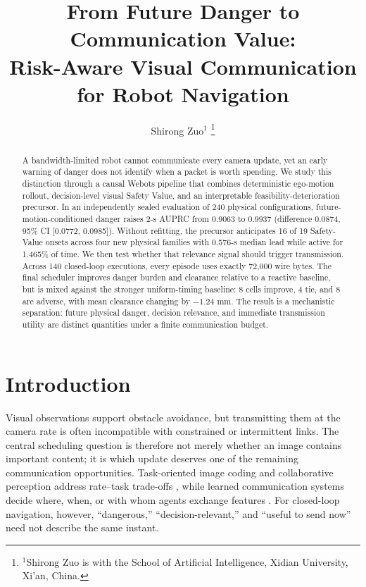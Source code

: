 \documentclass[letterpaper,10pt,conference]{ieeeconf}
\title{\LARGE \bf
From Future Danger to Communication Value:\\
Risk-Aware Visual Communication for Robot Navigation}
\author{Shirong Zuo$^{1}$%
\thanks{$^{1}$Shirong Zuo is with the School of Artificial Intelligence,
Xidian University, Xi'an, China.}}
\begin{document}
\maketitle
\thispagestyle{empty}
\pagestyle{empty}

\begin{abstract}
A bandwidth-limited robot cannot communicate every camera update, yet an early
warning of danger does not identify when a packet is worth spending. We study
this distinction through a causal Webots pipeline that combines deterministic
ego-motion rollout, decision-level visual Safety Value, and an interpretable
feasibility-deterioration precursor. In an independently sealed evaluation of
240 physical configurations, future-motion-conditioned danger raises 2-s
AUPRC from 0.9063 to 0.9937 (difference 0.0874, 95\% CI
[0.0772, 0.0985]). Without refitting, the precursor anticipates 16 of 19
Safety-Value onsets across four new physical families with 0.576-s median lead
while active for 1.465\% of time. We then test whether that relevance signal
should trigger transmission. Across 140 closed-loop executions, every episode
uses exactly 72,000 wire bytes. The final scheduler improves danger burden and
clearance relative to a reactive baseline, but is mixed against the stronger
uniform-timing baseline: 8 cells improve, 4 tie, and 8 are adverse, with mean
clearance changing by $-1.24$ mm. The result is a mechanistic separation:
future physical danger, decision relevance, and immediate transmission utility
are distinct quantities under a finite communication budget.
\end{abstract}

\section{Introduction}

Visual observations support obstacle avoidance, but transmitting them at the
camera rate is often incompatible with constrained or intermittent links. The
central scheduling question is therefore not merely whether an image contains
important content; it is which update deserves one of the remaining
communication opportunities. Task-oriented image coding and collaborative
perception address rate--task trade-offs \cite{liu2022task,hu2022where2comm},
while learned communication systems decide where, when, or with whom agents
exchange features \cite{liu2020when2com,wang2020v2vnet}. For closed-loop
navigation, however, ``dangerous,'' ``decision-relevant,'' and ``useful to send
now'' need not describe the same instant.
\end{document}
